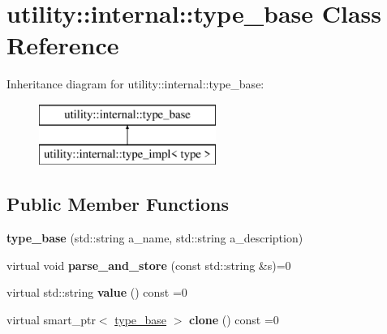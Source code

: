 \hypertarget{classutility_1_1internal_1_1type__base}{}\section{utility\+:\+:internal\+:\+:type\+\_\+base Class Reference}
\label{classutility_1_1internal_1_1type__base}
Inheritance diagram for utility\+:\+:internal\+:\+:type\+\_\+base\+:\begin{figure}[H]
\begin{center}
\leavevmode
\includegraphics[height=2.000000cm]{classutility_1_1internal_1_1type__base}
\end{center}
\end{figure}
\subsection*{Public Member Functions}
\begin{DoxyCompactItemize}
\item 
\hypertarget{classutility_1_1internal_1_1type__base_add108447c7b1095f886ed2f685b67497}{}{\bfseries type\+\_\+base} (std\+::string a\+\_\+name, std\+::string a\+\_\+description)\label{classutility_1_1internal_1_1type__base_add108447c7b1095f886ed2f685b67497}

\item 
\hypertarget{classutility_1_1internal_1_1type__base_aa29f66b663709d1b267be682ab6e2273}{}virtual void {\bfseries parse\+\_\+and\+\_\+store} (const std\+::string \&s)=0\label{classutility_1_1internal_1_1type__base_aa29f66b663709d1b267be682ab6e2273}

\item 
\hypertarget{classutility_1_1internal_1_1type__base_a699f0987990017c762285f4ff68f4a89}{}virtual std\+::string {\bfseries value} () const  =0\label{classutility_1_1internal_1_1type__base_a699f0987990017c762285f4ff68f4a89}

\item 
\hypertarget{classutility_1_1internal_1_1type__base_ae6add2c7d9d189c95ecb8dc7bacc4ab5}{}virtual smart\+\_\+ptr$<$ \hyperlink{classutility_1_1internal_1_1type__base}{type\+\_\+base} $>$ {\bfseries clone} () const  =0\label{classutility_1_1internal_1_1type__base_ae6add2c7d9d189c95ecb8dc7bacc4ab5}

\end{DoxyCompactItemize}
